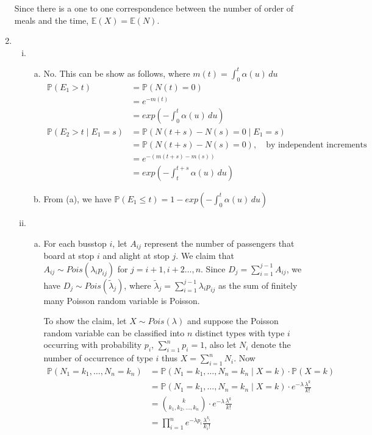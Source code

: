 \documentclass[a4paper,10pt]{article}
\theoremstyle{definition}
\begin{document}
\begin{enumerate}
Since there is a one to one correspondence between the number of order of meals and the time, $\mathbb{E}(X)=\mathbb{E}(N)$.

\item
\begin{enumerate}[(i)]
\item
\begin{enumerate}[(a)]
\item No. This can be show as follows, where $m(t)=\int_{0}^{t}\alpha(u)\,du$
\begin{align*}
\mathbb{P}(E_1>t)&=\mathbb{P}(N(t)=0)\\
&=e^{-m(t)}\\
&=exp\left(-\int_{0}^{t}\alpha(u)\,du\right)\\
\mathbb{P}(E_2>t\mid E_1=s)&=\mathbb{P}(N(t+s)-N(s)=0\mid E_1=s)\\
&=\mathbb{P}(N(t+s)-N(s)=0),\quad \text{by independent increments}\\
&=e^{-(m(t+s)-m(s))}\\
&=exp\left(-\int_{t}^{t+s}\alpha(u)\,du\right)
\end{align*}
\item From (a), we have $\mathbb{P}(E_1\leq t)=1-exp\left(-\int_{0}^{t}\alpha(u)\,du\right)$
\end{enumerate}
\item
\begin{enumerate}[(a)]
\item For each busstop $i$, let $A_{ij}$ represent the number of passengers that board at stop $i$ and alight at stop $j$. We claim that $A_{ij}\sim Pois(\lambda_ip_{ij})$ for $j=i+1,i+2\ldots,n$. Since $D_j=\sum_{i=1}^{j-1}A_{ij}$, we have $D_j\sim Pois(\tilde{\lambda}_j)$, where $\tilde{\lambda}_j=\sum_{i=1}^{j-1}\lambda_ip_{ij}$ as the sum of finitely many Poisson random variable is Poisson. 

To show the claim, let $X\sim Pois(\lambda)$ and suppose the Poisson random variable can be classified into $n$ distinct types with type $i$ occurring with probability $p_i$, $\sum_{i=1}^np_i=1$, also let $N_i$ denote the number of occurrence of type $i$ thus $X=\sum_{i=1}^{n}N_i$. Now
\begin{align*}
\mathbb{P}(N_1=k_1, \ldots, N_n=k_n)&=\mathbb{P}(N_1=k_1, \ldots, N_n=k_n\mid X=k)\cdot \mathbb{P}(X=k)\\
&=\mathbb{P}(N_1=k_1, \ldots, N_n=k_n\mid X=k)\cdot e^{-\lambda}\frac{\lambda^k}{k!}\\
&= \binom {k} {k_1,k_2,\ldots,k_n}\cdot e^{-\lambda}\frac{\lambda^k}{k!}\\
&= \prod_{i=1}^{n} e^{-\lambda p_i}\frac{\lambda^{k_i}}{k_i!}
\end{align*}


\end{enumerate}
\end{enumerate}
\end{enumerate}
\end{document}
